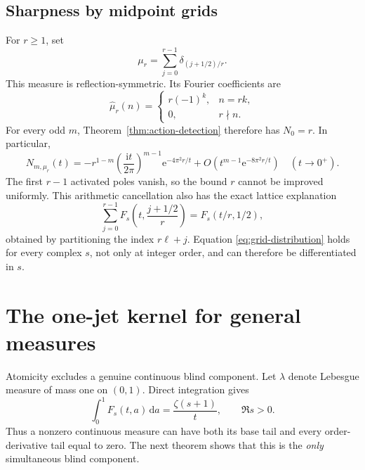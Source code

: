 \documentclass[11pt,a4paper]{article}
\numberwithin{equation}{section}
\theoremstyle{definition}\newtheorem{definition}[theorem]{Definition}
\theoremstyle{remark}\newtheorem{remark}[theorem]{Remark}
\newcommand{\ii}{\mathrm i}\newcommand{\e}{\mathrm e}
\newcommand{\dd}{\,\mathrm d}\newcommand{\Li}{\operatorname{Li}}
\begin{document}
\subsection{Sharpness by midpoint grids}
For $r\ge1$, set
\begin{equation}
 \mu_r=\sum_{j=0}^{r-1}\delta_{(j+1/2)/r}.
 \label{eq:midpoint}
\end{equation}
This measure is reflection-symmetric. Its Fourier coefficients are
\begin{equation}
 \widehat\mu_r(n)=
 \begin{cases}
 r(-1)^k,&n=rk,\\
 0,&r\nmid n.
 \end{cases}
 \label{eq:midpoint-Fourier}
\end{equation}
For every odd $m$, Theorem~\ref{thm:action-detection} therefore has
$N_0=r$. In particular,
\begin{equation}
 N_{m,\mu_r}(t)=
 -r^{1-m}\left(\frac{\ii t}{2\pi}\right)^{m-1}
 \e^{-4\pi^2r/t}+O\left(t^{m-1}\e^{-8\pi^2r/t}\right)
 \quad(t\to0^+).
 \label{eq:midpoint-first}
\end{equation}
The first $r-1$ activated poles vanish, so the bound $r$ cannot be
improved uniformly. This arithmetic cancellation also has the exact
lattice explanation
\begin{equation}
 \sum_{j=0}^{r-1}F_s\left(t,\frac{j+1/2}{r}\right)
                         =F_s(t/r,1/2),
 \label{eq:grid-distribution}
\end{equation}
obtained by partitioning the index $r\ell+j$. Equation
\eqref{eq:grid-distribution} holds for every complex $s$, not only at
integer order, and can therefore be differentiated in $s$.

\section{The one-jet kernel for general measures}
\label{sec:general-measures}

Atomicity excludes a genuine continuous blind component. Let $\lambda$
denote Lebesgue measure of mass one on $(0,1)$. Direct integration gives
\begin{equation}
 \int_0^1 F_s(t,a)\dd a=\frac{\zeta(s+1)}t,
 \qquad\Re s>0.
 \label{eq:Haar}
\end{equation}
Thus a nonzero continuous measure can have both its base tail and every
order-derivative tail equal to zero. The next theorem shows that this
is the \emph{only} simultaneous blind component.
\end{document}
